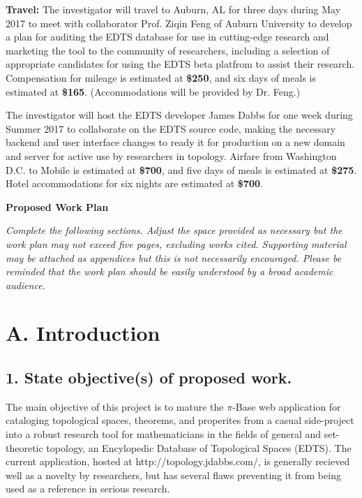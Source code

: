 \documentclass[10pt]{article}
\begin{document}
\textbf{Travel:} The investigator will travel to Auburn, AL for three days during May 2017 to meet with collaborator Prof. Ziqin Feng of Auburn University to develop a plan for auditing the EDTS database for use in cutting-edge research and marketing the tool to the community of researchers, including a selection of appropriate candidates for using the EDTS beta platfrom to assist their research. Compensation for mileage is estimated at \textbf{\$250}, and six days of meals is estimated at \textbf{\$165}. (Accommodations will be provided by Dr. Feng.)

The investigator will host the EDTS developer James Dabbs for one week during Summer 2017 to collaborate on the EDTS source code, making the necessary backend and user interface changes to ready it for production on a new domain and server for active use by researchers in topology. Airfare from Washington D.C. to Mobile is estimated at \textbf{\$700}, and five days of meals is estimated at \textbf{\$275}. Hotel accommodations for six nights are estimated at \textbf{\$700}.

\newpage




\centerline{\bf\Large
Proposed Work Plan
}

\textit{Complete the following sections. Adjust the space provided as necessary but the work plan may not exceed five pages, excluding works cited.  Supporting material may be attached as appendices but this is not necessarily encouraged.  Please be reminded that the work plan should be easily understood by a broad academic audience.}


\section*{A. Introduction}

\subsection*{1. State objective(s) of proposed work.}

The main objective of this project is to mature the \(\pi\)-Base web application
for cataloging topological spaces, theorems, and properites from a casual
side-project into a robust research tool for mathematicians in the fields of
general and set-theoretic topology, an Encylopedic Database of Topological
Spaces (EDTS). The current application, hosted at
http://topology.jdabbs.com/, is generally recieved well as a novelty by
researchers, but has several flaws preventing it from being used as a
reference in serious research.
\end{document}
